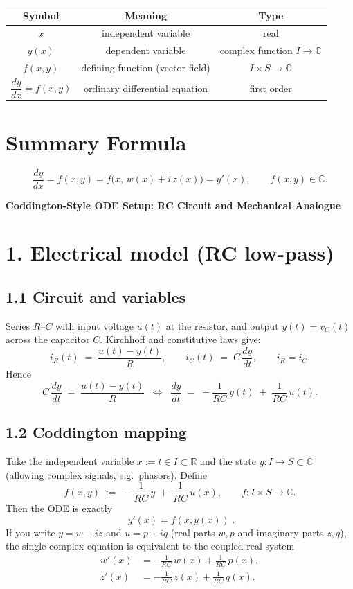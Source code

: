 \documentclass[12pt]{article}
\begin{document}
	\begin{center}
		\renewcommand{\arraystretch}{1.2}
		\begin{tabular}{|c|c|c|}
			\hline
			\textbf{Symbol} & \textbf{Meaning} & \textbf{Type}\\
			\hline
			\(x\) & independent variable & real\\
			\(y(x)\) & dependent variable & complex function \(I\!\to\!\mathbb{C}\)\\
			\(f(x,y)\) & defining function (vector field) & \(I\times S\!\to\!\mathbb{C}\)\\
			\(\dfrac{dy}{dx}=f(x,y)\) & ordinary differential equation & first order\\
			\hline
		\end{tabular}
	\end{center}
	
	\section*{Summary Formula}
	
	\[
	\boxed{
		\frac{dy}{dx} = f(x,y)
		= f\big(x,\,w(x)+i\,z(x)\big)
		= y'(x), \qquad f(x,y)\in\mathbb{C}.
	}
	\]
	
	\begin{center}
		{\Large \textbf{Coddington-Style ODE Setup: RC Circuit and Mechanical Analogue}}
	\end{center}
	
	\section*{1. Electrical model (RC low-pass)}
	
	\subsection*{1.1 Circuit and variables}
	Series $R$–$C$ with input voltage $u(t)$ at the resistor, and output $y(t)=v_C(t)$ across the capacitor $C$. Kirchhoff and constitutive laws give:
	$$
	i_R(t) \;=\; \frac{u(t)-y(t)}{R}, 
	\qquad
	i_C(t) \;=\; C\,\frac{dy}{dt},
	\qquad
	i_R=i_C.
	$$
	Hence
	$$
	C\,\frac{dy}{dt} \;=\; \frac{u(t)-y(t)}{R}
	\;\;\Longleftrightarrow\;\;
	\frac{dy}{dt} \;=\; -\frac{1}{RC}\,y(t) \;+\; \frac{1}{RC}\,u(t).
	$$
	
	\subsection*{1.2 Coddington mapping}
	Take the independent variable $x:=t\in I\subset\mathbb{R}$ and the state $y:I\to S\subset\mathbb{C}$ (allowing complex signals, e.g.\ phasors). Define
	$$
	f(x,y)\;:=\; -\frac{1}{RC}\,y \;+\; \frac{1}{RC}\,u(x),
	\qquad
	f: I\times S \to \mathbb{C}.
	$$
	Then the ODE is exactly
	$$
	\boxed{\; y'(x)=f(x,y(x)) \;}.
	$$
	If you write $y=w+iz$ and $u=p+iq$ (real parts $w,p$ and imaginary parts $z,q$), the single complex equation is equivalent to the coupled real system
	$$
	\begin{aligned}
		w'(x) &= -\frac{1}{RC}\,w(x) + \frac{1}{RC}\,p(x),\\
		z'(x) &= -\frac{1}{RC}\,z(x) + \frac{1}{RC}\,q(x).
	\end{aligned}
	$$
	
\end{document}
